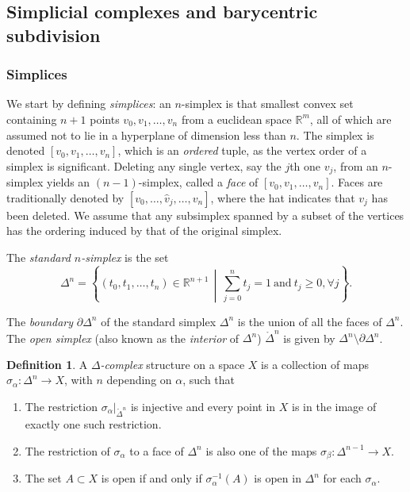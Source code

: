 \documentclass[12pt]{amsart}
\theoremstyle{definition}
\newtheorem{definition}[theorem]{Definition}
\theoremstyle{remark}
\numberwithin{equation}{section}
\begin{document}
\subsection{Simplicial complexes and barycentric subdivision}
\subsubsection{Simplices}
We start by defining \emph{simplices}: an $n$-simplex is that smallest convex set containing $n+1$ points $v_0, v_1, \ldots, v_n$ from a euclidean space $\mathbb{R}^m$, all of which are assumed not to lie in a hyperplane of dimension less than $n$. The simplex is denoted $[v_0, v_1,\ldots, v_n]$, which is an \emph{ordered} tuple, as the vertex order of a simplex is significant. Deleting any single vertex, say the $j$th one $v_j$, from an $n$-simplex yields an $(n-1)$-simplex, called a \emph{face} of $[v_0, v_1, \ldots, v_n]$. Faces are traditionally denoted by $[v_0, \ldots, \widehat{v}_j, \ldots, v_n]$, where the hat indicates that $v_j$ has been deleted. We assume that any subsimplex spanned by a subset of the vertices has the ordering induced by that of the original simplex. 

The \emph{standard $n$-simplex} is the set
\begin{equation}
	\Delta^n = \left\{ (t_0, t_1, \ldots, t_n) \in \mathbb{R}^{n+1}\,\middle|\, \sum_{j=0}^n t_j = 1\ \text{and}\  t_j\ge 0, \forall j\right\}.
\end{equation}

The \emph{boundary} $\partial \Delta^n$ of the standard simplex $\Delta^n$ is the union of all the faces of $\Delta^n$. The \emph{open simplex} (also known as the \emph{interior} of $\Delta^n$) $\mathring{\Delta}^n$ is given by $\Delta^n \setminus \partial{\Delta}^n$.

\begin{definition}
	A \emph{$\Delta$-complex} structure on a space $X$ is a collection of maps $\sigma_\alpha:\Delta^n\rightarrow X$, with $n$ depending on $\alpha$, such that 
	\begin{enumerate}
		\item The restriction $\sigma_\alpha|_{\mathring{\Delta}^n}$ is injective and every point in $X$ is in the image of exactly one such restriction.
		\item The restriction of $\sigma_\alpha$ to a face of $\Delta^n$ is also one of the maps $\sigma_\beta:\Delta^{n-1}\rightarrow X$. 
		\item The set $A\subset X$ is open if and only if $\sigma^{-1}_\alpha(A)$ is open in $\Delta^n$ for each $\sigma_\alpha$.
	\end{enumerate}
\end{definition}
\end{document}
